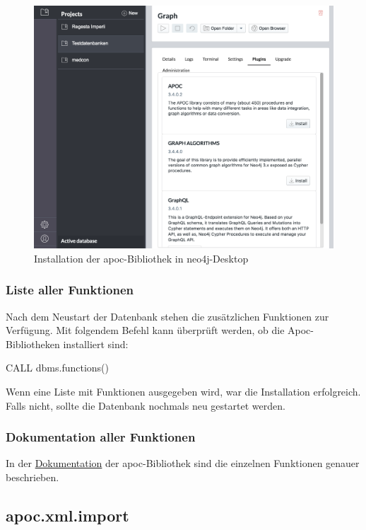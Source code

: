 \documentclass[12pt,ngerman,]{article}
\begin{document}
\begin{figure}
\centering
\includegraphics{Bilder/cypherFortgeschrittene/neo4j-Desktop-install-apoc.png}
\caption{Installation der apoc-Bibliothek in neo4j-Desktop}
\end{figure}

\subsubsection{Liste aller Funktionen}\label{liste-aller-funktionen}

Nach dem Neustart der Datenbank stehen die zusätzlichen Funktionen zur
Verfügung. Mit folgendem Befehl kann überprüft werden, ob die
Apoc-Bibliotheken installiert sind:

CALL dbms.functions()

Wenn eine Liste mit Funktionen ausgegeben wird, war die Installation
erfolgreich. Falls nicht, sollte die Datenbank nochmals neu gestartet
werden.

\subsubsection{Dokumentation aller
Funktionen}\label{dokumentation-aller-funktionen}

In der
\href{https://neo4j-contrib.github.io/neo4j-apoc-procedures/}{Dokumentation}
der apoc-Bibliothek sind die einzelnen Funktionen genauer beschrieben.

\subsection{apoc.xml.import}\label{apoc.xml.import}
\end{document}
